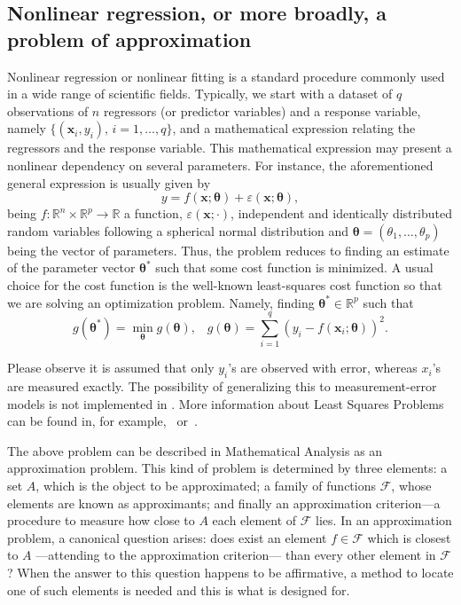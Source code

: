 \subsection{Nonlinear regression, or more broadly, a problem of approximation}
Nonlinear regression or nonlinear fitting is a standard procedure commonly used in a wide range of scientific fields. Typically, we start with a dataset of $q$ observations of $n$ regressors (or predictor variables) and a response variable, namely $\{(\mathbf{x}_i, y_i),\, i = 1,\ldots,q\}$, and a mathematical expression relating the regressors  and the response variable. This mathematical expression may present a nonlinear dependency on several parameters. For instance, the aforementioned general expression is usually given by
\begin{equation}\label{eq:fullnonlinear}
    y = f(\mathbf{x};\boldsymbol\theta) + \varepsilon(\mathbf{x};\boldsymbol\theta),
\end{equation}
being $f:\mathbb{R}^n\times\mathbb{R}^p\rightarrow \mathbb{R}$ a function,  $\varepsilon(\mathbf{x};\cdot)$, independent and identically distributed random variables following a spherical normal distribution and  $\boldsymbol\theta = (\theta_1,\ldots,\theta_p)$ being the vector of parameters.
Thus, the problem reduces to finding an estimate of the parameter vector $\boldsymbol\theta^*$ such that some cost function is minimized. A usual choice for the cost function is the well-known least-squares cost function so that we are solving an optimization problem. Namely, finding $\boldsymbol\theta^* \in \mathbb{R}^p$ such that
\begin{equation}\label{eq:optimization}
    g(\boldsymbol\theta^*)=\min_{\boldsymbol{\theta}} g(\boldsymbol{\theta}), \;\;\; g(\boldsymbol{\theta})=\sum_{i = 1}^q\left(y_i-f(\mathbf{x}_i;\boldsymbol\theta)\right)^2.
\end{equation}

Please observe it is assumed that only $y_i$'s are observed with error, whereas $x_i$'s are measured exactly. The possibility of generalizing this to measurement-error models is not implemented in . More information about Least Squares Problems can be found in, for example,~\citet{bjorck_numerical_methods} or~\citet{nocedal_numerical_optization}.

The above problem can be described in Mathematical Analysis as an approximation problem. This kind of problem is determined by three elements: a set $A$, which is the object to be approximated; a family of functions $\mathcal{F}$, whose elements are known as approximants; and finally an approximation criterion---a procedure to measure how close to $A$ each element of $\mathcal{F}$ lies. In an approximation problem, a canonical question arises: does exist an element $f \in \mathcal{F}$ which is closest to $A$ ---attending to the approximation criterion--- than every other element in $\mathcal{F}$? When the answer to this question happens to be affirmative, a method to locate one of such elements is needed and this is what  is designed for.


